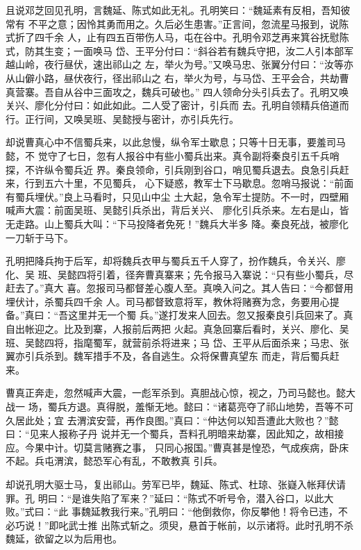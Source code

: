 且说邓芝回见孔明，言魏延、陈式如此无礼。孔明笑曰：“魏延素有反相，吾知彼常有
不平之意；因怜其勇而用之。久后必生患害。”正言间，忽流星马报到，说陈式折了四千余
人，止有四五百带伤人马，屯在谷中。孔明令邓芝再来箕谷抚慰陈式，防其生变；一面唤马
岱、王平分付曰：“斜谷若有魏兵守把，汝二人引本部军越山岭，夜行昼伏，速出祁山之
左，举火为号。”又唤马忠、张翼分付曰：“汝等亦从山僻小路，昼伏夜行，径出祁山之
右，举火为号，与马岱、王平会合，共劫曹真营寨。吾自从谷中三面攻之，魏兵可破也。”
四人领命分头引兵去了。孔明又唤关兴、廖化分付曰：如此如此。二人受了密计，引兵而
去。孔明自领精兵倍道而行。正行间，又唤吴班、吴懿授与密计，亦引兵先行。

却说曹真心中不信蜀兵来，以此怠慢，纵令军士歇息；只等十日无事，要羞司马懿，不
觉守了七日，忽有人报谷中有些小蜀兵出来。真令副将秦良引五千兵哨探，不许纵令蜀兵近
界。秦良领命，引兵刚到谷口，哨见蜀兵退去。良急引兵赶来，行到五六十里，不见蜀兵，
心下疑惑，教军士下马歇息。忽哨马报说：“前面有蜀兵埋伏。”良上马看时，只见山中尘
土大起，急令军士提防。不一时，四壁厢喊声大震：前面吴班、吴懿引兵杀出，背后关兴、
廖化引兵杀来。左右是山，皆无走路。山上蜀兵大叫：“下马投降者免死！”魏兵大半多
降。秦良死战，被廖化一刀斩于马下。

孔明把降兵拘于后军，却将魏兵衣甲与蜀兵五千人穿了，扮作魏兵，令关兴、廖化、吴
班、吴懿四将引着，径奔曹真寨来；先令报马入寨说：“只有些小蜀兵，尽赶去了。”真大
喜。忽报司马都督差心腹人至。真唤入问之。其人告曰：“今都督用埋伏计，杀蜀兵四千余
人。司马都督致意将军，教休将赌赛为念，务要用心提备。”真曰：“吾这里并无一个蜀
兵。”遂打发来人回去。忽又报秦良引兵回来了。真自出帐迎之。比及到寨，人报前后两把
火起。真急回寨后看时，关兴、廖化、吴班、吴懿四将，指麾蜀军，就营前杀将进来；马
岱、王平从后面杀来；马忠、张翼亦引兵杀到。魏军措手不及，各自逃生。众将保曹真望东
而走，背后蜀兵赶来。

曹真正奔走，忽然喊声大震，一彪军杀到。真胆战心惊，视之，乃司马懿也。懿大战一
场，蜀兵方退。真得脱，羞惭无地。懿曰：“诸葛亮夺了祁山地势，吾等不可久居此处；宜
去渭滨安营，再作良图。”真曰：“仲达何以知吾遭此大败也？”懿曰：“见来人报称子丹
说并无一个蜀兵，吾料孔明暗来劫寨，因此知之，故相接应。今果中计。切莫言赌赛之事，
只同心报国。”曹真甚是惶恐，气成疾病，卧床不起。兵屯渭滨，懿恐军心有乱，不敢教真
引兵。

却说孔明大驱士马，复出祁山。劳军已毕，魏延、陈式、杜琼、张嶷入帐拜伏请罪。孔
明曰：“是谁失陷了军来？”延曰：“陈式不听号令，潜入谷口，以此大败。”式曰：“此
事魏延教我行来。”孔明曰：“他倒救你，你反攀他！将令已违，不必巧说！”即叱武士推
出陈式斩之。须臾，悬首于帐前，以示诸将。此时孔明不杀魏延，欲留之以为后用也。

